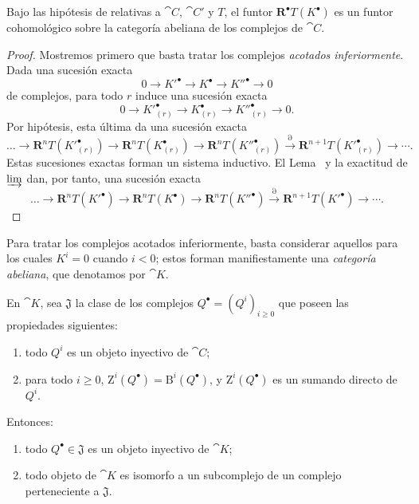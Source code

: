 \documentclass[oneside]{amsart}
\renewcommand{\geq}{\geqslant}
\newcommand{\oldpage}[2][]{{\marginnote{\normalfont\textbf{#1}~|~#2}}\ignorespaces}
\let\EGAOriginalLabel\label
\renewcommand{\label}[1]{\phantomsection\EGAOriginalLabel{#1}}
\begin{document}
\begin{proposition}[11.5.2]
\label{0.11.5.2}
Bajo las hipótesis de \textup{} relativas a $\cat{C}$, $\cat{C}'$ y $T$, el funtor $\mathbf{R}^\bullet T(K^\bullet)$ es un funtor cohomológico sobre la categoría abeliana de los complejos de $\cat{C}$.
\end{proposition}

\begin{proof}
Mostremos primero que basta tratar los complejos \emph{acotados inferiormente}.
Dada una sucesión exacta
\[
  0\longrightarrow K'^\bullet\longrightarrow K^\bullet
  \longrightarrow K''^\bullet\longrightarrow 0
\]
de complejos, para todo $r$ induce una sucesión exacta
\[
  0\longrightarrow K'^\bullet_{(r)}\longrightarrow K^\bullet_{(r)}
  \longrightarrow K''^\bullet_{(r)}\longrightarrow 0.
\]
Por hipótesis, esta última da una sucesión exacta
\[
  \ldots\longrightarrow\mathbf{R}^nT(K'^\bullet_{(r)})
  \longrightarrow\mathbf{R}^nT(K^\bullet_{(r)})
  \longrightarrow\mathbf{R}^nT(K''^\bullet_{(r)})
  \xrightarrow{\partial}\mathbf{R}^{n+1}T(K'^\bullet_{(r)})
  \longrightarrow\cdots .
\]
Estas sucesiones exactas forman un sistema inductivo.
El Lema~ y la exactitud de $\varinjlim$ dan, por tanto, una sucesión exacta
\[
  \ldots\longrightarrow\mathbf{R}^nT(K'^\bullet)
  \longrightarrow\mathbf{R}^nT(K^\bullet)
  \longrightarrow\mathbf{R}^nT(K''^\bullet)
  \xrightarrow{\partial}\mathbf{R}^{n+1}T(K'^\bullet)
  \longrightarrow\cdots .
\]
\end{proof}

Para tratar los complejos acotados inferiormente, basta considerar aquellos para los cuales $K^i=0$ cuando $i<0$; estos forman manifiestamente una \emph{categoría abeliana}, que denotamos por $\cat{K}$.

\begin{lemma}[11.5.2.1]
\label{0.11.5.2.1}
En $\cat{K}$, sea $\mathfrak{J}$ la clase de los complejos $Q^\bullet=(Q^i)_{i\geq0}$ que poseen las
\oldpage[0\textsubscript{III}]{37}
propiedades siguientes:
\begin{enumerate}
  \item[{\rm(1)}] todo $Q^i$ es un objeto inyectivo de $\cat{C}$;
  \item[{\rm(2)}] para todo $i\geq0$, $\mathrm{Z}^i(Q^\bullet)=\mathrm{B}^i(Q^\bullet)$, y $\mathrm{Z}^i(Q^\bullet)$ es un sumando directo de $Q^i$.
\end{enumerate}
Entonces:
\begin{enumerate}
  \item[{\rm(i)}] todo $Q^\bullet\in\mathfrak{J}$ es un objeto inyectivo de $\cat{K}$;
  \item[{\rm(ii)}] todo objeto de $\cat{K}$ es isomorfo a un subcomplejo de un complejo perteneciente a $\mathfrak{J}$.
\end{enumerate}
\end{lemma}
\end{document}
